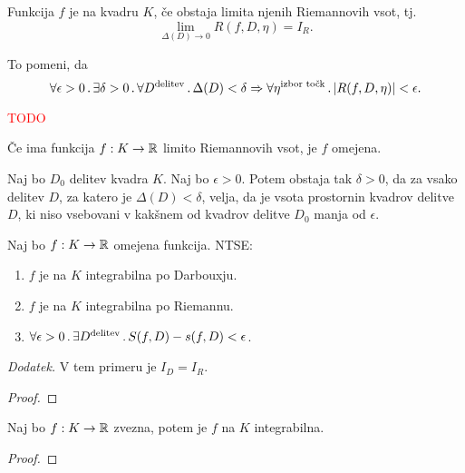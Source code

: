 \begin{definicija}
    Funkcija \(f\) je  na kvadru \(K\), če obstaja limita njenih Riemannovih vsot, tj.
    \[\lim_{\Delta(D) \to 0} R(f, D, \eta) = I_R.\]
\end{definicija}

\begin{opomba}
    To pomeni, da
    \[\forall \epsilon > 0 \,.\, \exists \delta > 0 \,.\, \forall D^\text{delitev} \,.\, \Delta(D) < \delta \Rightarrow \forall \eta^\text{izbor točk} \,.\, |R(f, D, \eta)| < \epsilon.\]
\end{opomba}

\begin{zgled}
    \textcolor{red}{TODO}
\end{zgled}

\begin{opomba}
    Če ima funkcija \(f: K \to \mathbb{R}\) limito Riemannovih vsot, je \(f\) omejena.
\end{opomba}

\begin{lema}
    Naj bo \(D_0\) delitev kvadra \(K\). Naj bo \(\epsilon > 0\). Potem obstaja tak \(\delta > 0\), da za vsako delitev \(D\), za katero je \(\Delta(D) < \delta\), velja, da je vsota prostornin kvadrov delitve \(D\), ki niso vsebovani v kakšnem od kvadrov delitve \(D_0\) manja od \(\epsilon\).
\end{lema}

\begin{izrek}
    Naj bo \(f: K \to \mathbb{R}\) omejena funkcija. NTSE:
    \begin{enumerate}
        \item \(f\) je na \(K\) integrabilna po Darbouxju.
        \item \(f\) je na \(K\) integrabilna po Riemannu.
        \item \(\forall \epsilon > 0 \,.\, \exists D^\text{delitev} \,.\, S(f,D) - s(f, D) < \epsilon\).
    \end{enumerate}
    \emph{Dodatek.} V tem primeru je \(I_D = I_R\).
\end{izrek}

\begin{proof}
    \todo
\end{proof}

\begin{trditev}
    Naj bo \(f: K \to \mathbb{R}\) zvezna, potem je \(f\) na \(K\) integrabilna.
\end{trditev}

\begin{proof}
    \todo
\end{proof}

